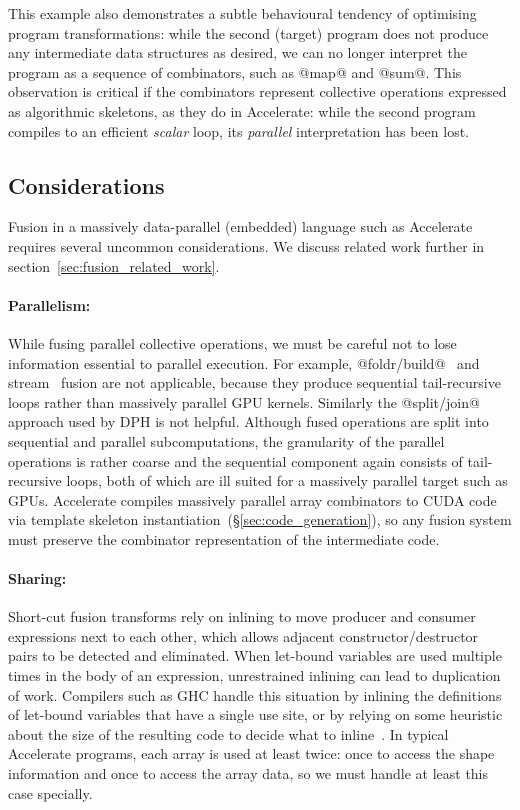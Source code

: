 This example also demonstrates a subtle behavioural tendency of optimising
program transformations: while the second (target) program does not produce any
intermediate data structures as desired, we can no longer interpret the program
as a sequence of combinators, such as @map@ and @sum@. This observation is
critical if the combinators represent collective operations expressed as
algorithmic skeletons, as they do in Accelerate: while the second program
compiles to an efficient \emph{scalar} loop, its \emph{parallel} interpretation
has been lost.


\subsection{Considerations}

Fusion in a massively data-parallel (embedded) language such as Accelerate
requires several uncommon considerations. We discuss related work further in
section~\ref{sec:fusion_related_work}.

\paragraph{Parallelism:} While fusing parallel collective operations, we must be
careful not to lose information essential to parallel execution. For example,
@foldr/build@~\cite{Gill:1993de} and
stream~\cite{Coutts:2007kp} fusion are not applicable,
because they produce sequential tail-recursive loops rather than massively
parallel GPU kernels. Similarly the
@split/join@~\cite{Keller:1999ic} approach used by
DPH is not helpful. Although fused operations are
split into sequential and parallel subcomputations, the granularity of the
parallel operations is rather coarse and the sequential component again consists
of tail-recursive loops, both of which are ill suited for a massively parallel
target such as GPUs. Accelerate compiles massively parallel array combinators to
CUDA code via template skeleton instantiation~(\S\ref{sec:code_generation}), so
any fusion system must preserve the combinator representation of the
intermediate code.


\paragraph{Sharing:} Short-cut fusion transforms rely on
inlining to move producer and consumer expressions next to each other, which
allows adjacent constructor/destructor pairs to be detected and eliminated. When
let-bound variables are used multiple times in the body of an expression,
unrestrained inlining can lead to duplication of work. Compilers such as GHC
handle this situation by inlining the definitions of let-bound variables that
have a single use site, or by relying on some heuristic about the size of the
resulting code to decide what to inline~\cite{PeytonJones:2003gb}. In typical
Accelerate programs, each array is used at least twice: once to access the shape
information and once to access the array data, so we must handle at least this
case specially.

